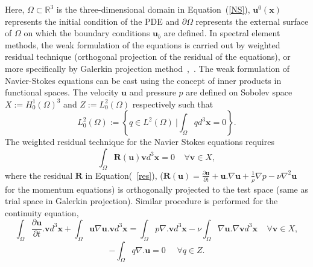 \documentclass[times]{fldauth}
\begin{document}
Here, ${\Omega} \subset \mathbb{R}^{3}$ is the three-dimensional domain in Equation~(\ref{NS}), $\mathbf{
u}^{0}(\mathbf{x})$ represents the initial condition of the PDE and $\partial{\Omega}$ represents the external surface of ${\Omega}$ on which the boundary conditions $\mathbf{u}_b$ are defined. In spectral element methods, the weak formulation of the equations is carried out by weighted residual technique (orthogonal projection of the residual of the equations), or more specifically by Galerkin projection method~\cite{fischer_jcp},~\cite{deville}. The weak formulation of Navier-Stokes equations can be cast using the concept of inner products in functional spaces. The velocity $\mathbf{u}$ and pressure $p$ are defined on Sobolev space $X:= H_0^{1}(\Omega)^3$ and $Z:= L_{0}^{2}(\Omega)$ respectively such that 
\begin{equation}
L_{0}^{2}(\Omega):= \left\{ q \in L^2(\Omega) \ \Bigg| \int_{\Omega}q d^{3}\mathbf{x} = 0 \right\}. \label{sob}
\end{equation}
The weighted residual technique for the Navier Stokes equations requires
\begin{equation}
\int_{\Omega}\mathcal{\mathbf{R}}(\mathbf{u})\mathbf{v}d^{3}\mathbf{x} = 0 \ \ \ \ \ \forall\mathbf{v}\in X, \label{res}
\end{equation}
where the residual $\mathcal{\mathbf{R}}$ in Equation(~\ref{res}), ($\mathcal{\mathbf{R}}(\mathbf{u}) = \frac{\partial \mathbf{u}}{\partial t} + \mathbf{u}.\nabla \mathbf{u} + \frac{1}{\rho}\nabla p - \nu \nabla^2 \mathbf{u} $ for the momentum equations) is orthogonally projected to the test space (same as trial space in Galerkin projection). Similar procedure is performed for the continuity equation,
\begin{equation}
\int_{\Omega}\frac{\partial{\mathbf{u}}}{\partial t}.\mathbf{v}d^{3}\mathbf{x} + \int_{\Omega}\mathbf{u}\nabla \mathbf{u}.\mathbf{v}d^{3}\mathbf{x} = \int_{\Omega}p\nabla.\mathbf{v}d^{3}\mathbf{x} -\nu\int_{\Omega}\nabla \mathbf{u}.\nabla \mathbf{v}d^{3}\mathbf{x}\ \ \ \ \ \forall\mathbf{v}\in X, \label{weak1}
\end{equation}
\begin{equation}
-\int_{\Omega}q\nabla.\mathbf{u} = 0 \ \ \ \ \ \ \forall {q}\in Z. \label{weak2}
\end{equation}
\end{document}
